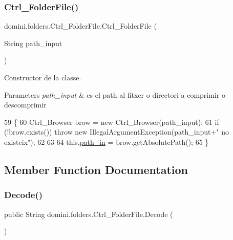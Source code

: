 \subsubsection{\texorpdfstring{Ctrl\+\_\+\+Folder\+File()}{Ctrl\_FolderFile()}}
{\footnotesize\ttfamily domini.\+folders.\+Ctrl\+\_\+\+Folder\+File.\+Ctrl\+\_\+\+Folder\+File (\begin{DoxyParamCaption}\item[{String}]{path\+\_\+input }\end{DoxyParamCaption})\hspace{0.3cm}{\ttfamily [inline]}}



Constructor de la classe. 


\begin{DoxyParams}{Parameters}
{\em path\+\_\+input} & es el path al fitxer o directori a comprimir o descomprimir \\
\hline
\end{DoxyParams}

\begin{DoxyCode}
59                                               \{
60         Ctrl\_Browser brow = \textcolor{keyword}{new} Ctrl\_Browser(path\_input);
61         \textcolor{keywordflow}{if} (!brow.exists()) \textcolor{keywordflow}{throw} \textcolor{keyword}{new} IllegalArgumentException(path\_input+\textcolor{stringliteral}{" no existeix"});
62 
63 
64         this.\hyperlink{classdomini_1_1folders_1_1Ctrl__FolderFile_a0d3946bb2832a1f34d0c2227df5c71c4}{path\_in} = brow.getAbsolutePath();
65     \}
\end{DoxyCode}


\subsection{Member Function Documentation}
\mbox{\label{classdomini_1_1folders_1_1Ctrl__FolderFile_a5d28ac7f5223ecd40a242148e86447c1}} 
\subsubsection{\texorpdfstring{Decode()}{Decode()}\hspace{0.1cm}{\footnotesize\ttfamily [1/2]}}
{\footnotesize\ttfamily public String domini.\+folders.\+Ctrl\+\_\+\+Folder\+File.\+Decode (\begin{DoxyParamCaption}{ }\end{DoxyParamCaption})\hspace{0.3cm}{\ttfamily [inline]}}



